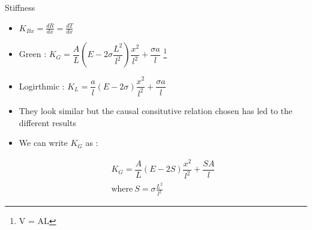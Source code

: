 	\begin{frame}{Stiffness}
		\begin{block}{}
			\begin{itemize}
				\item $K_{Bx} =  \frac{dR}{dx} = \frac{dT}{dx}$
				
				\item Green : $K_{G} =  \dfrac{A}{L}\left(E - 2\sigma \dfrac{L^2}{l^2} \right)\dfrac{x^2}{l^2} + \dfrac{\sigma a}{l}$ \footnote{V = AL}
				
				\item  Logirthmic : $K_{L} =  \dfrac{a}{l}\left(E - 2\sigma \right)\dfrac{x^2}{l^2} + \dfrac{\sigma a}{l}$		
			\end{itemize}
		\end{block}
	
		\begin{itemize}
			\item  They look similar but the causal consitutive relation chosen has led to the different results
			
			\item We can write $K_G$ as :
			
			\begin{align*}
				K_{G} =  \dfrac{A}{L}\left(E - 2S \right)\dfrac{x^2}{l^2} + \dfrac{S A}{l}\\
				\text{where}~S = \sigma \frac{L^2}{l^2}
			\end{align*}
			
		\end{itemize}
		 
	\end{frame}